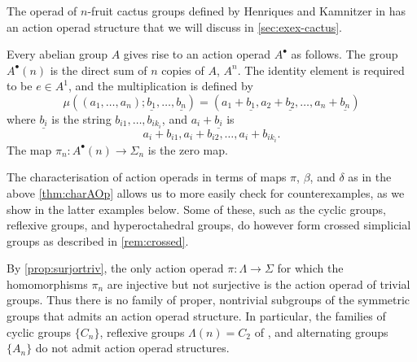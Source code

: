 \begin{example}\label{ex:cactus-aop}
The operad of $n$-fruit cactus groups defined by Henriques and Kamnitzer in \cite{hk-cobound} has an action operad structure that we will discuss in \cref{sec:exex-cactus}.
\end{example}

\begin{example}\label{ex:abgp-aop}
Every abelian group $A$ gives rise to an action operad $A^{\bullet}$ as follows. The group $A^{\bullet}(n)$ is the direct sum of $n$ copies of $A$, $A^{n}$. The identity element is required to be $e \in A^{1}$, and the multiplication is defined by
  \[
    \mu((a_{1}, \ldots, a_{n}); \underline{b_1}, \ldots, \underline{b_n}) = (a_{1}+\underline{b_{1}}, a_{2} + \underline{b_{2}}, \ldots, a_{n} + \underline{b_{n}})
  \]
where $\underline{b_{i}}$ is the string $b_{i1}, \ldots, b_{ik_{i}}$, and $a_{i} + \underline{b_{i}}$ is
  \[
    a_{i} + b_{i1}, a_{i} + b_{i2}, \ldots, a_{i} + b_{ik_{i}}.
  \]
The map $\pi_n \colon A^\bullet(n) \rightarrow \Sigma_n$ is the zero map. 
\end{example}

The characterisation of action operads in terms of maps $\pi$, $\beta$, and $\delta$ as in the above \cref{thm:charAOp} allows us to more easily check for counterexamples, as we show in the latter examples below. Some of these, such as the cyclic groups, reflexive groups, and hyperoctahedral groups, do however form crossed simplicial groups as described in \cref{rem:crossed}.

\begin{example}\label{ex:counterex1}
By \cref{prop:surjortriv}, the only action operad $\pi \colon \Lambda \to \Sigma$ for which the homomorphisms $\pi_n$ are injective but not surjective is the action operad of trivial groups. 
Thus there is no family of proper, nontrivial subgroups of the symmetric groups that admits an action operad structure.
In particular, the families of cyclic groups $\{ C_n \}$, reflexive groups $\Lambda(n) = C_2$ of \cite{Kra87}, and alternating groups $\{ A_n \}$ do not admit action operad structures.
\end{example}

